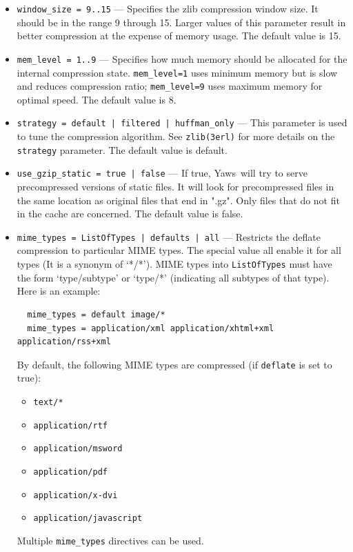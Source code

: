 \documentclass[11pt,oneside,english]{book}
\newcommand{\Yaws}            %
        {{\sc Yaws}}
\begin{document}
\begin{itemize}
\begin{itemize}
             \item \verb+window_size = 9..15+ --- Specifies the zlib compression
               window size. It should be in the range 9 through 15. Larger
               values of this parameter result in better compression at the
               expense of memory usage. The default value is 15.

             \item \verb+mem_level = 1..9+ --- Specifies how much memory should
               be allocated for the internal compression
               state. \verb+mem_level=1+ uses minimum memory but is slow and
               reduces compression ratio; \verb+mem_level=9+ uses maximum memory
               for optimal speed. The default value is 8.

             \item \verb+strategy = default | filtered | huffman_only+ --- This
               parameter is used to tune the compression algorithm. See
               \verb+zlib(3erl)+ for more details on the \verb+strategy+
               parameter. The default value is default.

             \item \verb+use_gzip_static = true | false+ --- If true,
               \Yaws\ will try to serve precompressed versions of static
               files. It will look for precompressed files in the same location
               as original files that end in ".gz". Only files that do not fit
               in the cache are concerned. The default value is false.

             \item \verb+mime_types = ListOfTypes | defaults | all+ ---
               Restricts the deflate compression to particular MIME types. The
               special value all enable it for all types (It is a synonym of
               `*/*'). MIME types into \verb+ListOfTypes+ must have the form
               `type/subtype' or `type/*' (indicating all subtypes of that
               type). Here is an example:
\begin{verbatim}
  mime_types = default image/*
  mime_types = application/xml application/xhtml+xml application/rss+xml
\end{verbatim}
                    By default, the following MIME types are compressed (if
                    \verb+deflate+ is set to true):

                    \begin{itemize}
                    \item \verb+text/*+
                    \item \verb+application/rtf+
                    \item \verb+application/msword+
                    \item \verb+application/pdf+
                    \item \verb+application/x-dvi+
                    \item \verb+application/javascript+
                    \end{itemize}
                    Multiple \verb+mime_types+ directives can be used.
             \end{itemize}


\end{itemize}
\end{document}
